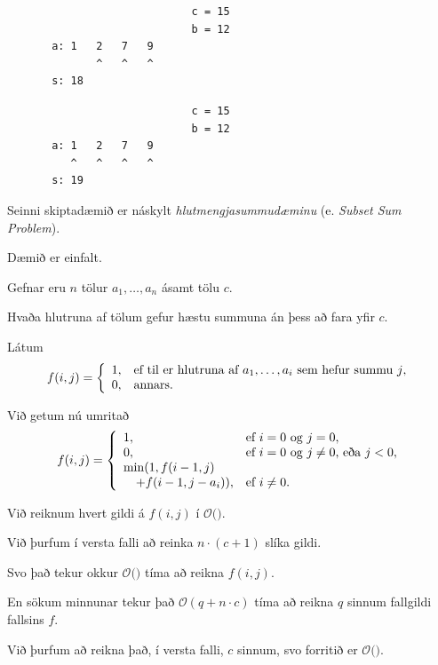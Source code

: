 { \begin{verbatim}
                             c = 15
                             b = 12
       a: 1   2   7   9
              ^   ^   ^    
       s: 18
\end{verbatim} }

{ \begin{verbatim}
                             c = 15
                             b = 12
       a: 1   2   7   9
          ^   ^   ^   ^    
       s: 19
\end{verbatim} }

{
	{
		\item<1-> Seinni skiptadæmið er náskylt \emph{hlutmengjasummudæminu} (e. \emph{Subset Sum Problem}).
		\item<2-> Dæmið er einfalt.
		\item<3-> Gefnar eru $n$ tölur $a_1, \dots, a_n$ ásamt tölu $c$.
		\item<4-> Hvaða hlutruna af tölum gefur hæstu summuna án þess að fara yfir $c$.
	}
}

{
	\only<all:1>{\sssA}
	\only<all:2>{\sssB}
	\only<all:3>{\sssC}
	\only<all:4>{\sssD}
	\only<all:5>{\sssE}
	\only<all:6>{\sssF}
	\only<all:7>{\sssG}
	\only<all:8>{\sssHA}
	\only<all:9>{\sssHB}
	\only<all:10>{\sssHC}
	\only<all:11>{\sssHD}
	\only<all:12>{\sssI}
	\only<all:13>{\sssJ}
	\only<all:14>{\sssK}
	\only<all:15>{\sssL}
	\only<all:16>{\sssM}
}

{
	{
		\item<1-> Látum
		\[
			f(i, j) =
			\left \{
			\env{array}
			{
				{l l}
				1, & \text{ef til er hlutruna af $a_1, \dots, a_i$ sem hefur summu $j$},\\
				0, & \text{annars}.
			}
			\right .
		\]
		\item<2-> Við getum nú umritað
		\[
			f(i, j) =
			\left \{
			\env{array}
			{
				{l l}
				1, & \text{ef $i = 0$ og $j = 0$},\\
				0, & \text{ef $i = 0$ og $j \neq 0$, eða $j < 0$},\\
				\min(1, f(i - 1, j) \\
						\quad + f(i - 1, j - a_i)), & \text{ef $i \neq 0$}.
			}
			\right .
		\]
	}
}

{
}

{
	{
		\item<1-> Við reiknum hvert gildi á $f(i, j)$ í $\mathcal{O}($\onslide<2->{$\,1\,$}$)$.
		\item<3-> Við þurfum í versta falli að reinka $n \cdot (c + 1)$ slíka gildi.
		\item<4-> Svo það tekur okkur $\mathcal{O}($$)$ tíma að reikna $f(i, j)$.
		\item<6-> En sökum minnunar tekur það $\mathcal{O}(q + n \cdot c)$ tíma að reikna $q$ sinnum fallgildi fallsins $f$.
		\item<7-> Við þurfum að reikna það, í versta falli, $c$ sinnum, svo forritið er $\mathcal{O}($\onslide<8->{$n \cdot c$}$)$.
	}
}

